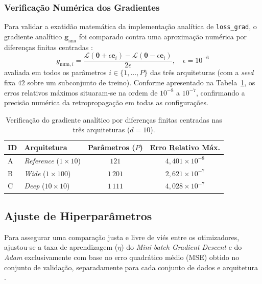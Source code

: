 \documentclass[conference]{IEEEtran}
\begin{document}
\subsubsection{Verificação Numérica dos Gradientes}
Para validar a exatidão matemática da implementação analítica de \texttt{loss\_grad}, o gradiente analítico $\mathbf{g}_{\text{ana}}$ foi comparado contra uma aproximação numérica por diferenças finitas centradas \cite{b1, b9}:
\begin{equation}
g_{\text{num}, i} = \frac{\mathcal{L}(\boldsymbol{\theta} + \epsilon \mathbf{e}_i) - \mathcal{L}(\boldsymbol{\theta} - \epsilon \mathbf{e}_i)}{2\epsilon}, \quad \epsilon = 10^{-6}
\end{equation}
avaliada em todos os parâmetros $i \in \{1, \dots, P\}$ das três arquiteturas (com a \textit{seed} fixa $42$ sobre um subconjunto de treino). Conforme apresentado na Tabela~\ref{tab:grad_check}, os erros relativos máximos situaram-se na ordem de $10^{-8}$ a $10^{-7}$, confirmando a precisão numérica da retropropagação em todas as configurações.

\begin{table}[htbp]
\caption{Verificação do gradiente analítico por diferenças finitas centradas nas três arquiteturas ($d = 10$).}
\label{tab:grad_check}
\centering
\scriptsize
\begin{tabular}{@{}llcc@{}}
\toprule
\textbf{ID} & \textbf{Arquitetura} & \textbf{Parâmetros ($P$)} & \textbf{Erro Relativo Máx.} \\
\midrule
A & \textit{Reference} ($1 \times 10$) & $121$ & $4{,}401 \times 10^{-8}$ \\
B & \textit{Wide} ($1 \times 100$) & $1\,201$ & $2{,}621 \times 10^{-7}$ \\
C & \textit{Deep} ($10 \times 10$) & $1\,111$ & $4{,}028 \times 10^{-7}$ \\
\bottomrule
\end{tabular}
\end{table}

\subsection{Ajuste de Hiperparâmetros}

Para assegurar uma comparação justa e livre de viés entre os otimizadores, ajustou-se a taxa de aprendizagem ($\eta$) do \textit{Mini-batch Gradient Descent} e do \textit{Adam} exclusivamente com base no erro quadrático médio (MSE) obtido no conjunto de validação, separadamente para cada conjunto de dados e arquitetura \cite{b1}.
\end{document}
